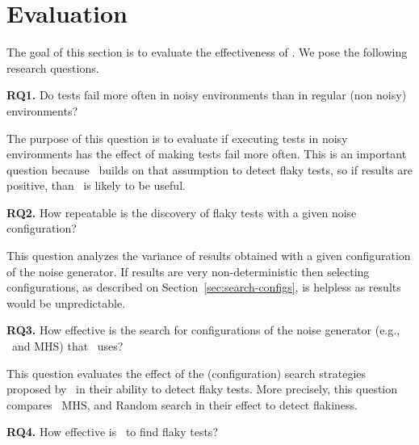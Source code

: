 \documentclass[conference]{IEEEtran}
\begin{document}
\section{Evaluation}
\label{sec:eval}
The goal of this section is to evaluate the effectiveness of \tname. We pose the following research questions.

\newcommand{\rqone}{Do tests fail more often in noisy environments than in regular (non noisy) environments?}

\newcommand{\rqtwo}{How repeatable is the discovery of flaky tests with a given noise configuration?}

\newcommand{\rqthree}{How effective is the search for configurations of the noise 
generator (e.g., \greedy\ and MHS) that \tname\ uses?}

\newcommand{\rqfour}{How effective is \tname\ to find flaky tests?}

\newcommand{\rqfive}{How effective is \tname\ to find \emph{new} flaky tests?}

\vspace{0.5ex}
\noindent\textbf{RQ1.} \rqone
\vspace{0.5ex}

The purpose of this question is to evaluate if executing tests in noisy environments has the effect of making tests fail more often. This is an important question because \tname\ builds on that assumption to detect flaky tests, so if results are positive, than \tname\ is likely to be useful. 

\vspace{0.5ex}
\noindent\textbf{RQ2.} \rqtwo
\vspace{0.5ex}

This question analyzes the variance of results obtained with a given configuration of the noise generator. If results are very non-deterministic then selecting configurations, as described on Section~\ref{sec:search-configs}, is helpless as results would be unpredictable. 

\vspace{0.5ex}
\noindent\textbf{RQ3.} \rqthree
\vspace{0.5ex}

This question evaluates the effect of the (configuration) search strategies proposed by \tname\ in their ability to detect flaky tests. More precisely, this question compares \greedy\, MHS, and Random search in their effect to detect flakiness.


\vspace{0.5ex}
\noindent\textbf{RQ4.} \rqfour
\vspace{0.5ex}
\end{document}
